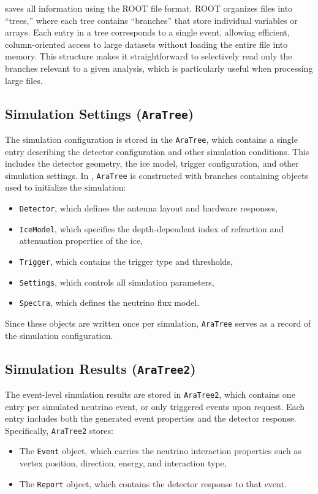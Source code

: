         \arasim{} saves all information using the ROOT file format.
        ROOT organizes files into ``trees,''
        where each tree contains ``branches'' that store individual variables or arrays.
        Each entry in a tree corresponds to a single event,
        allowing efficient, column-oriented access to large datasets
        without loading the entire file into memory.
        This structure makes it straightforward to selectively read
        only the branches relevant to a given analysis,
        which is particularly useful when processing large files.
        
        \subsection{Simulation Settings (\texttt{AraTree})}
        
        The simulation configuration is stored in the \texttt{AraTree}, which contains a single entry describing the detector configuration and other simulation conditions.
        This includes the detector geometry, the ice model, trigger configuration, and other simulation settings.
        In \arasim{}, \texttt{AraTree} is constructed with branches containing objects used to initialize the simulation:
        \begin{itemize}
            \item \texttt{Detector}, which defines the antenna layout and hardware responses,
            \item \texttt{IceModel}, which specifies the depth-dependent index of refraction and attenuation properties of the ice, 
            \item \texttt{Trigger}, which contains the trigger type and thresholds,
            \item \texttt{Settings}, which controls all simulation parameters,
            \item \texttt{Spectra}, which defines the neutrino flux model.
        \end{itemize}
        Since these objects are written once per simulation, \texttt{AraTree} serves as a record of the simulation configuration.
        
        \subsection{Simulation Results (\texttt{AraTree2})}
        
        The event-level simulation results are stored in \texttt{AraTree2}, which contains one entry per simulated neutrino event, or only triggered events upon request.
        Each entry includes both the generated event properties and the detector response.
        Specifically, \texttt{AraTree2} stores:
        \begin{itemize}
            \item The \texttt{Event} object, which carries the neutrino interaction properties such as vertex position, direction, energy, and interaction type,
            \item The \texttt{Report} object, which contains the detector response to that event.
        \end{itemize}

